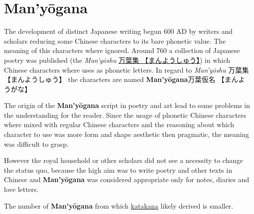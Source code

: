 \section{Man'yōgana}
\label{sec:Manyogana}
\label{sec:Manyoshu}

The development of distinct Japanese writing begun 600 AD by writers and
scholars reducing some Chinese characters to its bare phonetic value. The
meaning of this characters where ignored. Around 760 a collection of Japanese
poetry was published (the \textit{Man'yōshu} \Link
\href{https://en.wikipedia.org/wiki/Man%27y%C5%8Dsh%C5%AB}{万葉集
【まんようしゅう】}) in which Chinese characters where uses as phonetic
letters. In regard to \textit{Man'yōshu} {万葉集} {【まんようしゅう】} the
characters are named \textbf{Man'yōgana}{万葉仮名} {【まんようがな】}

The origin of the \textbf{Man'yōgana} script in poetry and art lead to some
problems in the understanding for the reader. Since the usage of phonetic
Chinese characters where mixed with regular Chinese characters and the
reasoning about which character to use was more form and shape aesthetic then
pragmatic, the meaning was difficult to grasp.

However the royal household or other scholars did not see a necessity to change
the status quo, because the high aim was to write poetry and other texts in
Chinese and \textbf{Man'yōgana} was considered appropriate only for notes,
diaries and love letters.


The number of \textbf{Man'yōgana} from which \hyperref[sec:Katakana]{katakana}
likely derived is smaller.

